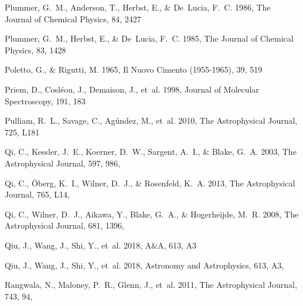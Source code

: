 \documentclass[twocolumn]{aastex631}
\begin{document}
\begin{thebibliography}{}
Plummer, G.~M., Anderson, T., Herbst, E., \& De~Lucia, F.~C. 1986, The Journal
  of Chemical Physics, 84, 2427

Plummer, G.~M., Herbst, E., \& De~Lucia, F.~C. 1985, The Journal of Chemical
  Physics, 83, 1428

Poletto, G., \& Rigutti, M. 1965, Il Nuovo Cimento (1955-1965), 39, 519

Priem, D., Cosl{\'e}ou, J., Demaison, J., {et~al.} 1998, Journal of Molecular
  Spectroscopy, 191, 183

Pulliam, R.~L., Savage, C., Ag{\'u}ndez, M., {et~al.} 2010, The Astrophysical
  Journal, 725, L181

{Qi}, C., {Kessler}, J.~E., {Koerner}, D.~W., {Sargent}, A.~I., \& {Blake},
  G.~A. 2003, The Astrophysical Journal, 597, 986, 

{Qi}, C., {{\"O}berg}, K.~I., {Wilner}, D.~J., \& {Rosenfeld}, K.~A. 2013, The
  Astrophysical Journal, 765, L14, 

{Qi}, C., {Wilner}, D.~J., {Aikawa}, Y., {Blake}, G.~A., \& {Hogerheijde},
  M.~R. 2008, The Astrophysical Journal, 681, 1396, 

Qiu, J., Wang, J., Shi, Y., {et~al.} 2018, A{\&}A, 613, A3

{Qiu}, J., {Wang}, J., {Shi}, Y., {et~al.} 2018, Astronomy and Astrophysics,
  613, A3, 

{Rangwala}, N., {Maloney}, P.~R., {Glenn}, J., {et~al.} 2011, The Astrophysical
  Journal, 743, 94, 


\end{thebibliography}
\end{document}
